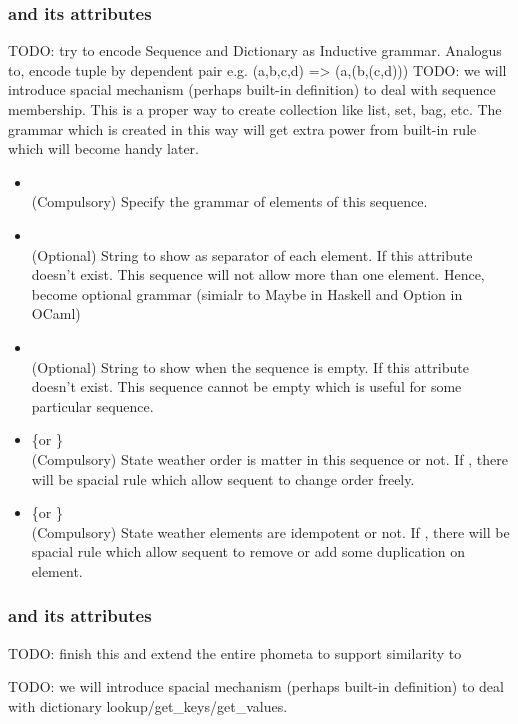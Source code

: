 \documentclass[master.tex]{subfiles}
\begin{document}
\subsubsection{\kSequence and its attributes}
TODO: try to encode Sequence and Dictionary as Inductive grammar. Analogus to, encode tuple by dependent pair e.g. (a,b,c,d) => (a,(b,(c,d)))
TODO: we will introduce spacial mechanism (perhaps built-in definition) to deal with sequence membership.
This is a proper way to create collection like list, set, bag, etc. The grammar which is created in this way will get extra power from built-in rule which will become handy later.
\begin{itemize}
    \item \kSubGrammar {} \\
    (Compulsory) Specify the grammar of elements of this sequence.
    \item \kDelimiter {} \\
    (Optional) String to show as separator of each element. If this attribute doesn't exist. This sequence will not allow more than one element. Hence, become optional grammar (simialr to Maybe in Haskell and Option in OCaml)
    \item \kWhenEmpty {} \\
    (Optional) String to show when the sequence is empty. If this attribute doesn't exist. This sequence cannot be empty which is useful for some particular sequence.
    \item \kCommutative \{\kTrue or \kFalse\} \\
    (Compulsory) State weather order is matter in this sequence or not. If \kTrue, there will be spacial rule which allow sequent to change order freely.
    \item \kIdempotent \{\kTrue or \kFalse\} \\
    (Compulsory) State weather elements are idempotent or not. If \kTrue, there will be spacial rule which allow sequent to remove or add some duplication on element.
\end{itemize}

\subsubsection{\kDictionary and its attributes}
TODO: finish this and extend the entire phometa to support \kDictionary similarity to \kSequence

TODO: we will introduce spacial mechanism (perhaps built-in definition) to deal with dictionary lookup/get\_keys/get\_values.
\end{document}
